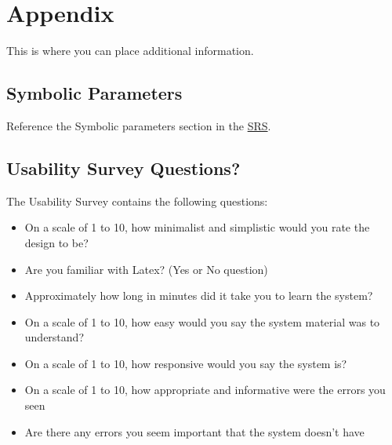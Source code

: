 \documentclass[12pt, titlepage]{article}
\begin{document}
	
	
	
	
	
	
	\newpage
	
	\section{Appendix}
	
	This is where you can place additional information.
	
	\subsection{Symbolic Parameters}
	
	Reference the Symbolic parameters section in the \href{https://github.com/RutheniumVI/UnderTree/blob/main/docs/SRS/SRS.pdf}{SRS}. 
	
	\subsection{Usability Survey Questions?}
	
	
	The Usability Survey contains the following questions:
	\begin{itemize}
		\item On a scale of 1 to 10, how minimalist and simplistic would you rate the design to be?
		\item Are you familiar with Latex? (Yes or No question)
		\item Approximately how long in minutes did it take you to learn the system?
		\item On a scale of 1 to 10, how easy would you say the system material was to understand?
		\item On a scale of 1 to 10, how responsive would you say the system is?
		\item On a scale of 1 to 10, how appropriate and informative were the errors you seen
		\item Are there any errors you seem important that the system doesn't have
	\end{itemize}
	
\end{document}
